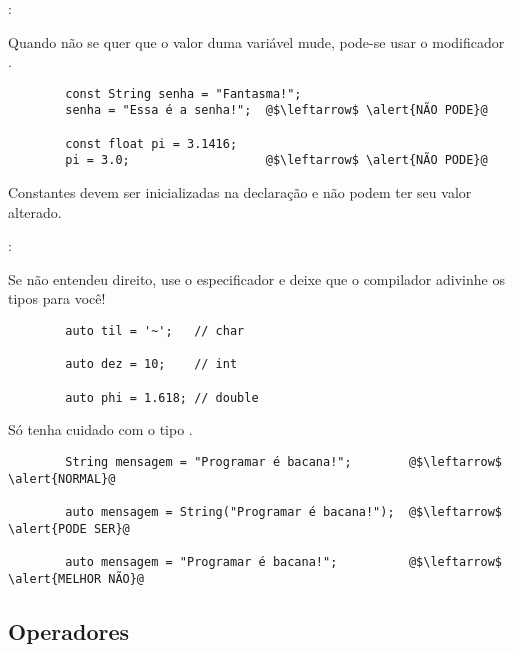 \begin{frame}[fragile]{\insertsection: \insertsubsection}

	Quando não se quer que o valor duma variável mude, pode-se usar o modificador \texttt{}.
	\begin{verbatim}
		const String senha = "Fantasma!";
		senha = "Essa é a senha!";  @$\leftarrow$ \alert{NÃO PODE}@

		const float pi = 3.1416;
		pi = 3.0;                   @$\leftarrow$ \alert{NÃO PODE}@
	\end{verbatim}

	Constantes devem ser inicializadas na declaração e não podem ter seu valor alterado.

\end{frame}


\begin{frame}[fragile]{\insertsection: \insertsubsection}

	Se não entendeu direito, use o especificador \texttt{} e deixe que o compilador adivinhe os tipos para você!
	\begin{verbatim}
		auto til = '~';   // char

		auto dez = 10;    // int

		auto phi = 1.618; // double
	\end{verbatim}

	\pause
	\bigskip
	Só tenha cuidado com o tipo \texttt{}.
	\begin{verbatim}
		String mensagem = "Programar é bacana!";        @$\leftarrow$ \alert{NORMAL}@

		auto mensagem = String("Programar é bacana!");  @$\leftarrow$ \alert{PODE SER}@

		auto mensagem = "Programar é bacana!";          @$\leftarrow$ \alert{MELHOR NÃO}@
	\end{verbatim}

\end{frame}


\subsection{Operadores}


